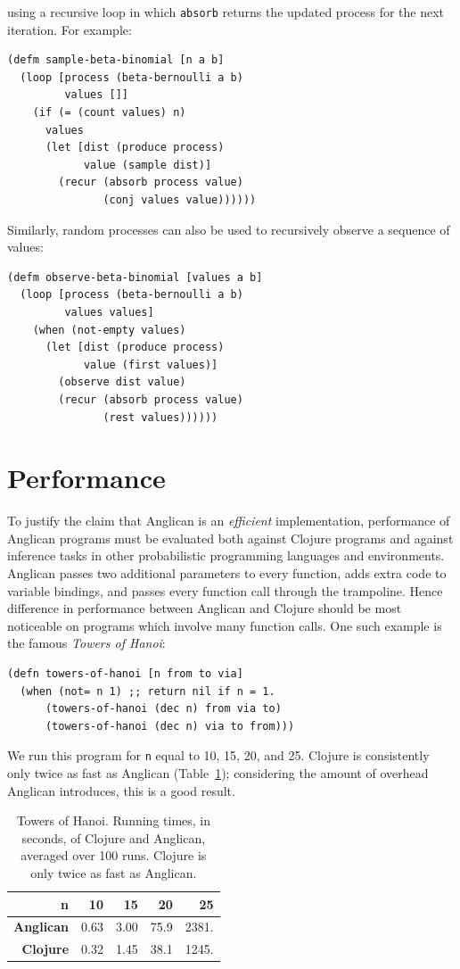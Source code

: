 \documentclass[preprint]{sigplanconf}
\begin{document}
using a recursive loop in which \texttt{absorb} returns the
updated process for the next iteration. For example:
\begin{lstlisting}[style=default]
(defm sample-beta-binomial [n a b]
  (loop [process (beta-bernoulli a b)
         values []]
    (if (= (count values) n)
      values
      (let [dist (produce process)
            value (sample dist)]
        (recur (absorb process value)
               (conj values value))))))
\end{lstlisting}
Similarly, random processes can also be used to recursively
observe a sequence of values:
\begin{lstlisting}[style=default]
(defm observe-beta-binomial [values a b]
  (loop [process (beta-bernoulli a b)
         values values] 
    (when (not-empty values)
      (let [dist (produce process)
            value (first values)]
        (observe dist value)
        (recur (absorb process value)
               (rest values))))))
\end{lstlisting}

\section{Performance}

To justify the claim that Anglican is an \textit{efficient}
implementation, performance of Anglican programs must be evaluated
both against Clojure programs and against inference tasks in
other probabilistic programming languages and environments.
Anglican passes two additional parameters to every function, adds
extra code to variable bindings, and passes every function
call through the trampoline. Hence difference in performance
between Anglican and Clojure should be most noticeable on
programs which involve many function calls. One such example is
the famous \textit{Towers of Hanoi}:

\begin{lstlisting}[style=default]
(defn towers-of-hanoi [n from to via]
  (when (not= n 1) ;; return nil if n = 1.
      (towers-of-hanoi (dec n) from via to)
      (towers-of-hanoi (dec n) via to from)))
\end{lstlisting}

We run this program for \texttt{n} equal to 10, 15, 20, and 25. Clojure
is consistently only twice as fast as Anglican
(Table~\ref{tbl:hanoi}); considering the amount of overhead
Anglican introduces, this is a good result.
\begin{table}[!b]
    \centering
    \begin{tabular}{r|r|r|r|r}
        {\bf n}  & 10 & 15 & 20 & 25 \\ \hline
        {\bf Anglican} & 0.63 & 3.00 & 75.9 & 2381.  \\ \hline
        {\bf Clojure} &  0.32 & 1.45 & 38.1  &  1245.
    \end{tabular}
    \caption{Towers of Hanoi. Running times, in
    seconds, of Clojure and Anglican, averaged over 100 runs.
    Clojure is only twice as fast as Anglican.}
    \label{tbl:hanoi}
\end{table}
\end{document}
